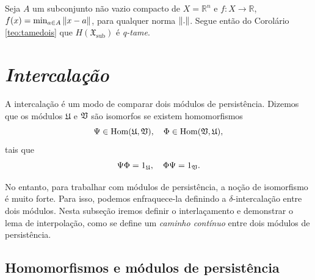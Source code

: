\begin{cor}\label{teo:tametres} 
Seja $A$ um subconjunto não vazio compacto de $X = \mathbb{R}^n$ e $f \colon X \to \mathbb{R}$, $f(x) =
\min_{a\in A} \left\lVert x-a\right\rVert$, para qualquer norma $\left\lVert.\right\rVert$. Segue então do Corolário \ref{teo:tamedois}
que $H(\mathfrak{X}_{\text{sub}})$ é \textit{q-tame}.
\end{cor}

\section{\textit{Intercalação}} 

A intercalação é um modo de comparar dois módulos de persistência. Dizemos que os módulos
$\mathfrak{U}$ e $\mathfrak{V}$ são isomorfos se existem homomorfismos
\begin{equation*}
    \Psi \in \text{Hom}(\mathfrak{U}, \mathfrak{V}), \quad \Phi \in \text{Hom}(\mathfrak{V}, \mathfrak{U}), 
\end{equation*}
tais que 
\begin{equation*}
    \Psi \Phi = 1_{\mathfrak{U}}, \quad \Phi \Psi = 1_{\mathfrak{V}}.
\end{equation*}

No entanto, para trabalhar com módulos de persistência, a noção de isomorfismo é muito forte. 
Para isso, podemos enfraquece-la definindo a $\delta$-intercalação entre dois módulos. 
Nesta subseção iremos definir o interlaçamento e demonstrar o lema de interpolação,
como se define um \textit{caminho contínuo} entre dois módulos de persistência. 

\subsection{Homomorfismos e módulos de persistência}

